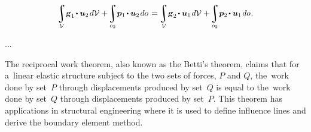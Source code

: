 \nopagebreak\vspace{1.3em}\begin{equation}\label{betti:reciprocalworktheorem}
\tikzmark{beginReciprocalFirstVariant}
\scalebox{.96}{$ \displaystyle %
   \integral\displaylimits_{\mathcal{V}} \hspace{-0.4ex} \volumeloadvector_1 \hspace{-0.2ex} \dotp \bm{u}_2 \hspace{.25ex} d\mathcal{V} $}
+ \hspace{-0.3ex}
\scalebox{.96}{$ \displaystyle %
   \integral\displaylimits_{o_2} \hspace{-0.4ex} \bm{p}_1 \hspace{-0.2ex} \dotp \bm{u}_2 \hspace{.25ex} do $}
\tikzmark{endReciprocalFirstVariant}
%
\hspace{.2ex} = \hspace{-0.2ex}
%
\tikzmark{beginReciprocalSecondVariant}
\scalebox{.96}{$ \displaystyle %
   \integral\displaylimits_{\mathcal{V}} \hspace{-0.4ex} \volumeloadvector_2 \hspace{-0.2ex} \dotp \bm{u}_1 \hspace{.25ex} d\mathcal{V} $}
+ \hspace{-0.3ex}
\scalebox{.96}{$ \displaystyle %
   \integral\displaylimits_{o_2} \hspace{-0.4ex} \bm{p}_2 \hspace{-0.2ex} \dotp \bm{u}_1 \hspace{.25ex} do $}
\tikzmark{endReciprocalSecondVariant}
\hspace{.1ex} .
\end{equation}%
%

...

{\small
The reciprocal work theorem, also known as the Betti’s theorem, claims that for a~linear elastic structure subject to the two sets of forces, $P$ and $Q$, the~work done by set~$P$ through displacements produced by set~$Q$ is equal to the~work done by set~$Q$ through displacements produced by set~$P$.
This theorem has applications in structural engineering where it is used to define influence lines and derive the boundary element method.
\par}


